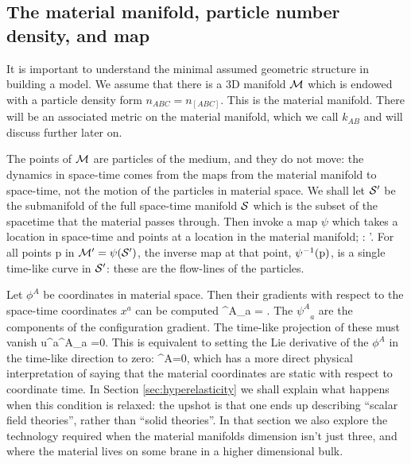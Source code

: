 \subsection{The material manifold,  particle number density, and map}
\label{sec:mpnd}
It is important to understand the minimal assumed geometric structure in building a model. We  assume that there is a 3D   manifold $\mathcal{M}$ which is endowed with a particle density form $n_{ABC} = n_{[ABC]}$. This is the material manifold. There will be an associated metric on the material manifold, which we call $k_{AB}$ and will discuss further later on. 

The points of $\mathcal{M}$ are  particles of the medium, and they do not move: the dynamics in space-time comes from the maps from the material manifold to space-time, not the motion of the particles in material space.  We shall let  $\mathcal{S}'$ be the submanifold of the full space-time manifold $\mathcal{S}$  which is the subset of the spacetime that the material passes through. Then invoke a map $\psi$ which takes a location in space-time and points at a location in the material manifold;
\bea
\psi : \stmanif'\longrightarrow \matmanif.
\eea
For all points p in $\mathcal{M}' = \psi(\mathcal{S}')$, the inverse map at that point, $\psi^{-1}({\rm p})$, is a single time-like curve in $\mathcal{S}'$: these are the flow-lines of the particles. 

Let $\phi^A$ be   coordinates in material space. Then their gradients with respect to the space-time coordinates $x^a$ can be computed
\bea
\label{eq:sec:config_gradient}
{\psi^A}_a = .
\eea
The ${\psi^A}_a$ are   the components of the configuration gradient. The time-like projection of these must vanish
\bea
\label{eq:sec:ortho-condition}
u^a{\psi^A}_a =0.
\eea
This is equivalent to setting the Lie derivative of the $\phi^A$ in the time-like direction to zero:
\bea
{}\phi^A=0,
\eea
which has a more direct physical interpretation of saying that the material coordinates are static with respect to coordinate time. In Section \ref{sec:hyperelasticity} we shall explain what happens when this condition is relaxed: the upshot is that one ends up describing ``scalar field theories'', rather than ``solid theories''.  In that section we also explore the technology required when the material manifolds dimension isn't just three, and where the material lives on some brane in a higher dimensional bulk.


